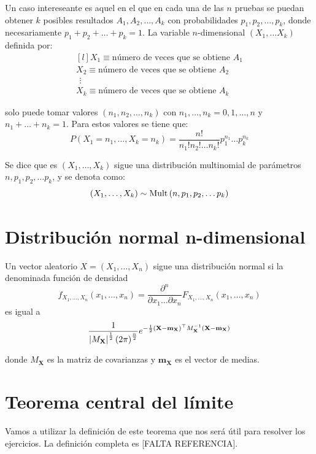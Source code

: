 \documentclass[a4paper]{book}
\renewcommand{\vec}[1]{\mathbf{#1}} %
\begin{document}
Un caso intereseante es aquel en el que en cada una de las $n$ pruebas se puedan obtener $k$ posibles resultados $A_1,A_2, \dots ,A_k$ con probabilidades $p_1,p_2, \dots ,p_k$, donde necesariamente $p_1 +p_2 + \dots + p_k = 1$. La variable $n$-dimensional $\left( X_1, \dots X_k \right)$ definida por:
\[ \begin{matrix*}[l]
		X_1 \equiv \text{número de veces que se obtiene }A_1\\[5pt]
		X_2 \equiv \text{número de veces que se obtiene }A_2\\[5pt]
		\ \, \vdots \\[5pt]
		X_k \equiv \text{número de veces que se obtiene }A_k
	\end{matrix*} \]

solo puede tomar valores $\left( n_1, n_2, \dots , n_k \right)$ con $n_1,\dots ,n_k=0,1,\dots ,n$ y $n_1 + \dots + n_k = 1$. Para estos valores se tiene que:
\[ P \left( X_1=n_1, \dots , X_k = n_k \right) = \frac{n!}{n_1!n_2!\dots n_k!} p_1^{n_1} \dots p_k^{n_k} \]

Se dice que es $\left( X_1,\dots ,X_k \right)$ sigue una distribución multinomial de parámetros $n,p_1,p_2,\dots p_k$, y se denota como:
\[ \left( X_1,\dots ,X_k \right) \sim \operatorname{Mult} \left( n,p_1,p_2,\dots p_k \right) \]

\section{Distribución normal n-dimensional}

Un vector aleatorio $ X = \left( X_1, \dots , X_n \right) $ sigue una distribución normal si la denominada función de densidad
\[ f_{X_1,\dots , X_n}\left( x_1, \dots , x_n \right) = \frac{\partial ^n}{\partial x_1 \dots \partial x_n}F_{X_1, \dots , X_n} \left( x_1, \dots , x_n \right)\]
es igual a
\[ \frac{1}{\abs{M_{\vec{X}}}^{\frac{1}{2} } \left( 2 \pi  \right) ^{\frac{n}{2}}} e^{-\frac{1}{2}\left( \vec{X} - \vec{m}_{\vec{X}} \right) ^{\top} M_{\vec{X}}^{-1} \left( \vec{X} - \vec{m}_{\vec{X}} \right) }\]

donde $M_{\vec{X}}$ es la matriz de covarianzas y $\vec{m}_{\vec{X}}$ es el vector de medias.

\section{Teorema central del límite}

Vamos a utilizar la definición de este teorema que nos será útil para resolver los ejercicios. La definición completa es [FALTA REFERENCIA].
\end{document}
